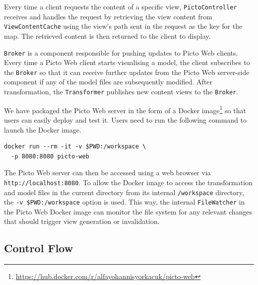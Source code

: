 \documentclass[sigconf,review]{acmart}
\begin{document}
Every time a client requests the content of a specific view, \texttt{PictoController} receives and handles the request by retrieving the view content from \texttt{ViewContentCache} using the view's path sent in the request as the key for the map. The retrieved content is then returned to the client to display.

\texttt{Broker} is a component responsible for pushing updates to Picto Web clients. Every time a Picto Web client starts visualising a model, the client subscribes to the \texttt{Broker} so that it can receive further updates from the Picto Web server-side component if any of the model files are subsequently modified. After transformation, the \texttt{Transformer} publishes new content views to the \texttt{Broker}.

We have packaged the Picto Web server in the form of a Docker image\footnote{\url{https://hub.docker.com/r/alfayohannisyorkacuk/picto-web}} so that users can easily deploy and test it. Users need to run the following command to launch the Docker image.

\begin{verbatim}
docker run --rm -it -v $PWD:/workspace \
  -p 8080:8080 picto-web
\end{verbatim}

The Picto Web server can then be accessed using a web browser via \texttt{http://localhost:8080}. To allow the Docker image to access the transformation and model files in the current directory from its internal \texttt{/workspace} directory, the \texttt{-v \$PWD:/workspace} option is used. This way, the internal \texttt{FileWatcher} in the Picto Web Docker image can monitor the file system for any relevant changes that should trigger view generation or invalidation.

\subsection{Control Flow}
\end{document}

